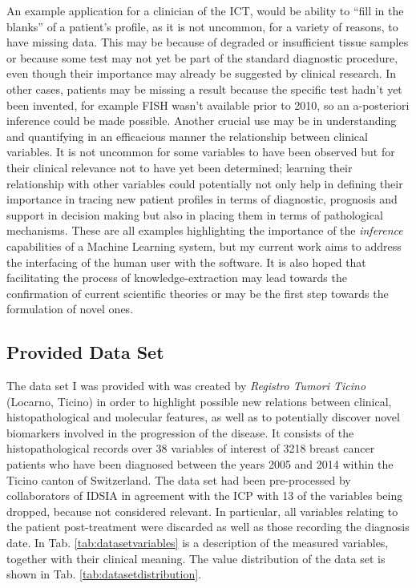 An example application for a clinician of the ICT, would be ability to \enquote{fill in the blanks} of a patient's profile, as it is not uncommon, for a variety of reasons, to have missing data.
This may be because of degraded or insufficient tissue samples or because some test may not yet be part of the standard diagnostic procedure, even though their importance may already be suggested by clinical research.
In other cases, patients may be missing a result because the specific test hadn't yet been invented, for example FISH wasn’t available prior to 2010, so an a-posteriori inference could be made possible.
Another crucial use may be in understanding and quantifying in an efficacious manner the relationship between clinical variables.
It is not uncommon for some variables to have been observed but for their clinical relevance not to have yet been determined; learning their relationship with other variables could potentially not only help in defining their importance in tracing new patient profiles in terms of diagnostic, prognosis and support in decision making but also in placing them in terms of pathological mechanisms.
These are all examples highlighting the importance of the \textit{inference} capabilities of a Machine Learning system, but my current work aims to address the interfacing of the human user with the software. 
It is also hoped that facilitating the process of knowledge-extraction may lead towards the confirmation of current scientific theories or may be the first step towards the formulation of novel ones.


\subsection{Provided Data Set}
The data set I was provided with was created by \textit{Registro Tumori Ticino} (Locarno, Ticino) in order to highlight possible new relations between clinical, histopathological and molecular features, as well as to potentially discover novel biomarkers involved in the progression of the disease.
It consists of the histopathological records over 38 variables of interest of 3218 breast cancer patients who have been diagnosed between the years 2005 and 2014 within the Ticino canton of Switzerland.
The data set had been pre-processed by collaborators of IDSIA in agreement with the ICP with 13 of the variables being dropped, because not considered relevant.
In particular, all variables relating to the patient post-treatment were discarded as well as those recording the diagnosis date.
In Tab. \ref{tab:datasetvariables} is a description of the measured variables, together with their clinical meaning.
The value distribution of the data set is shown in Tab. \ref{tab:datasetdistribution}.

